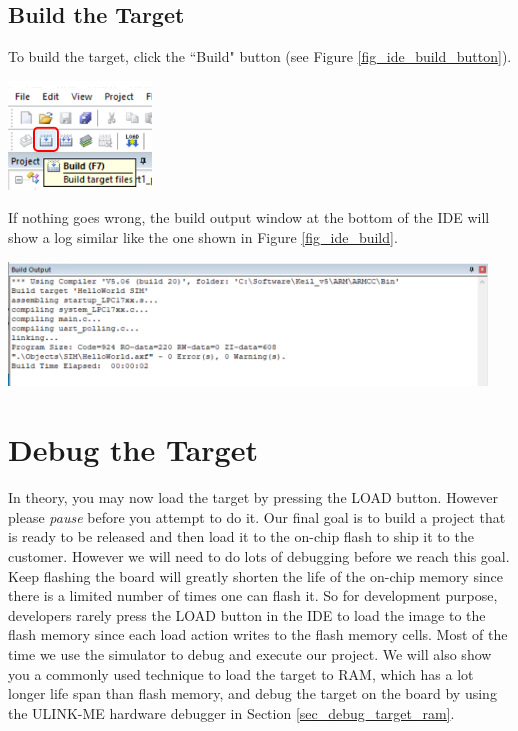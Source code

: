   \subsection{Build the Target}
    To build the target, click the ``Build" button (see Figure \ref{fig_ide_build_button}). \par

    \begin{minipage}{\linewidth}
      \centering
      \includegraphics[width=1.5in]{figure/uv5/IDE_build_button}
      \label{fig_ide_build_button}
    \end{minipage}
If nothing goes wrong, the build output window at the bottom of the IDE will show a log similar like the one shown in Figure \ref{fig_ide_build}. \par  
    \begin{minipage}{\linewidth}
      \centering
      \includegraphics[width=5in]{figure/uv5/IDE_build}
      \label{fig_ide_build}
    \end{minipage}

\section{Debug the Target}
In theory, you may now load the target by pressing the LOAD button. However please {\em pause} before you attempt to do it. Our final goal is to build a project that is ready to be released and then load it to the on-chip flash to ship it to the customer. However we will need to do lots of debugging before we reach this goal. Keep flashing the board will greatly shorten the life of the on-chip memory since there is a limited number of times one can flash it. So for development purpose, developers rarely press the LOAD button in the IDE to load the image to the flash memory since each load action writes to the flash memory cells. Most of the time we use the simulator to debug and execute our project. We will also show you a commonly used technique to load the target to RAM, which has a lot longer life span than flash memory, and debug the target on the board by using the ULINK-ME hardware debugger in Section \ref{sec_debug_target_ram}.

